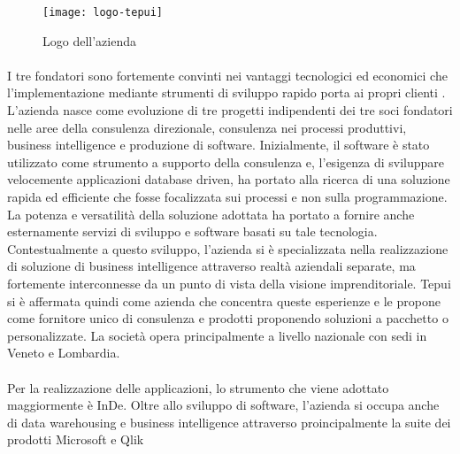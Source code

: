 \begin{figure}[!h] 
	\centering 
	\texttt{[image: logo-tepui]} 
	\caption{Logo dell'azienda}
\end{figure}

 
\paragraph*{}I tre fondatori sono fortemente convinti nei vantaggi tecnologici ed economici che l'implementazione mediante strumenti di sviluppo rapido porta ai propri clienti \cite{[1]}. 
L'azienda nasce come evoluzione di tre progetti indipendenti dei tre soci fondatori nelle aree della consulenza direzionale, consulenza nei processi produttivi, business intelligence  e produzione di software. 
Inizialmente, il software è stato utilizzato come strumento a supporto della consulenza e, l'esigenza di sviluppare velocemente applicazioni database driven, ha portato alla ricerca di una soluzione rapida ed efficiente che fosse focalizzata sui processi e non sulla programmazione. 
La potenza e versatilità della soluzione adottata ha portato a fornire anche esternamente servizi di sviluppo e software basati su tale tecnologia. 
Contestualmente a questo sviluppo, l'azienda si è specializzata nella realizzazione di soluzione di business intelligence attraverso realtà aziendali separate, ma fortemente interconnesse da un punto di vista della visione imprenditoriale.
Tepui si è affermata quindi come azienda che concentra queste esperienze e le propone come fornitore unico di consulenza e prodotti proponendo soluzioni a pacchetto o personalizzate. 
La società opera principalmente a livello nazionale con sedi in Veneto e Lombardia.

\paragraph*{}Per la realizzazione delle applicazioni, lo strumento che viene adottato maggiormente è InDe. Oltre allo sviluppo di software, l’azienda si occupa anche di data warehousing e business intelligence attraverso proincipalmente la suite dei prodotti Microsoft e Qlik 



